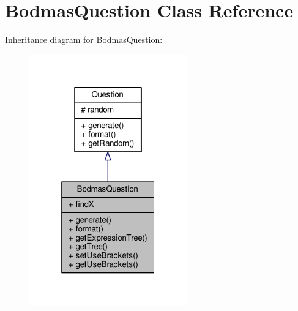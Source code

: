 \hypertarget{classBodmasQuestion}{}\section{Bodmas\+Question Class Reference}
\label{classBodmasQuestion}


Inheritance diagram for Bodmas\+Question\+:
\nopagebreak
\begin{figure}[H]
\begin{center}
\leavevmode
\includegraphics[width=193pt]{classBodmasQuestion__inherit__graph}
\end{center}
\end{figure}


